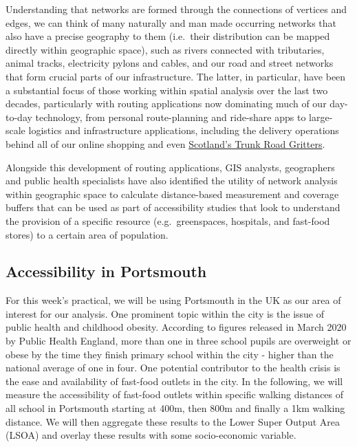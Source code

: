 \documentclass[
]{book}
\begin{document}
Understanding that networks are formed through the connections of vertices and edges, we can think of many naturally and man made occurring networks that also have a precise geography to them (i.e.~their distribution can be mapped directly within geographic space), such as rivers connected with tributaries, animal tracks, electricity pylons and cables, and our road and street networks that form crucial parts of our infrastructure. The latter, in particular, have been a substantial focus of those working within spatial analysis over the last two decades, particularly with routing applications now dominating much of our day-to-day technology, from personal route-planning and ride-share apps to large-scale logistics and infrastructure applications, including the delivery operations behind all of our online shopping and even \href{https://www.arcgis.com/apps/webappviewer/index.html?id=2de764a9303848ffb9a4cac0bd0b1aab}{Scotland's Trunk Road Gritters}.

Alongside this development of routing applications, GIS analysts, geographers and public health specialists have also identified the utility of network analysis within geographic space to calculate distance-based measurement and coverage buffers that can be used as part of accessibility studies that look to understand the provision of a specific resource (e.g.~greenspaces, hospitals, and fast-food stores) to a certain area of population.

\hypertarget{accessibility-in-portsmouth}{%
\subsection{Accessibility in Portsmouth}\label{accessibility-in-portsmouth}}

For this week's practical, we will be using Portsmouth in the UK as our area of interest for our analysis. One prominent topic within the city is the issue of public health and childhood obesity. According to figures released in March 2020 by Public Health England, more than one in three school pupils are overweight or obese by the time they finish primary school within the city - higher than the national average of one in four. One potential contributor to the health crisis is the ease and availability of fast-food outlets in the city. In the following, we will measure the accessibility of fast-food outlets within specific walking distances of all school in Portsmouth starting at 400m, then 800m and finally a 1km walking distance. We will then aggregate these results to the Lower Super Output Area (LSOA) and overlay these results with some socio-economic variable.
\end{document}
